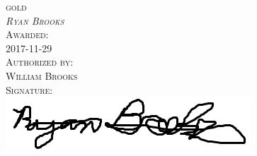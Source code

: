 \documentclass[landscape]{article}
\begin{document}
\begin{center}
\Huge
\textsc{gold}
\bigskip 
\\  
\textsc{\emph{Ryan Brooks}}
\bigskip
\\ 
\textsc{Awarded:} 
\bigskip
\\ 
\textsc{2017-11-29}
\bigskip
\\ 
\textsc{Authorized by:} 
\bigskip
\\ 
\textsc{William Brooks}
\bigskip
\\ 
\textsc{Signature: }
\bigskip
\\ 
\includegraphics{1528493654735_signature2.PNG}
\end{center}
\end{document}
